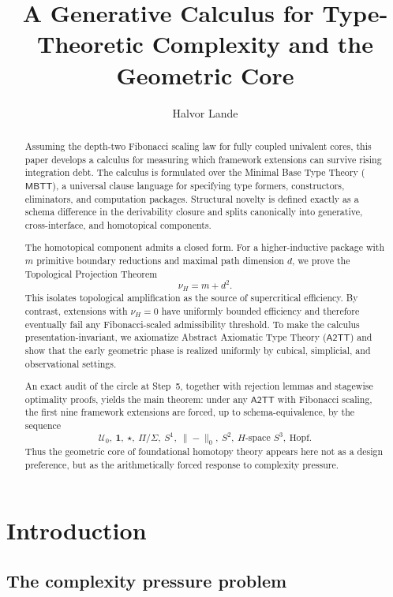 \documentclass{lmcs}
\title[Generative Calculus and the Geometric Core]{A Generative Calculus for Type-Theoretic Complexity and the Geometric Core}
\author[H.\ Lande]{Halvor Lande}
\newcommand{\U}{\mathcal{U}}
\newcommand{\MBTT}{\mathsf{MBTT}}
\newcommand{\ATwoTT}{\mathsf{A2TT}}
\newcommand{\Trunc}[1]{\|#1\|_0}
\begin{document}
\begin{abstract}
Assuming the depth-two Fibonacci scaling law for fully coupled univalent cores, this paper develops a calculus for measuring which framework extensions can survive rising integration debt. The calculus is formulated over the Minimal Base Type Theory ($\MBTT$), a universal clause language for specifying type formers, constructors, eliminators, and computation packages. Structural novelty is defined exactly as a schema difference in the derivability closure and splits canonically into generative, cross-interface, and homotopical components.

The homotopical component admits a closed form. For a higher-inductive package with $m$ primitive boundary reductions and maximal path dimension $d$, we prove the Topological Projection Theorem
\[
  \nu_H = m + d^2.
\]
This isolates topological amplification as the source of supercritical efficiency. By contrast, extensions with $\nu_H=0$ have uniformly bounded efficiency and therefore eventually fail any Fibonacci-scaled admissibility threshold. To make the calculus presentation-invariant, we axiomatize Abstract Axiomatic Type Theory ($\ATwoTT$) and show that the early geometric phase is realized uniformly by cubical, simplicial, and observational settings.

An exact audit of the circle at Step~5, together with rejection lemmas and stagewise optimality proofs, yields the main theorem: under any $\ATwoTT$ with Fibonacci scaling, the first nine framework extensions are forced, up to schema-equivalence, by the sequence
\[
  \U_0,\ \mathbf 1,\ \star,\ \Pi/\Sigma,\ S^1,\ \Trunc{-},\ S^2,\ \text{$H$-space }S^3,\ \text{Hopf}.
\]
Thus the geometric core of foundational homotopy theory appears here not as a design preference, but as the arithmetically forced response to complexity pressure.
\end{abstract}

\maketitle

\section{Introduction}
\label{sec:introduction}

\subsection{The complexity pressure problem}
\end{document}
